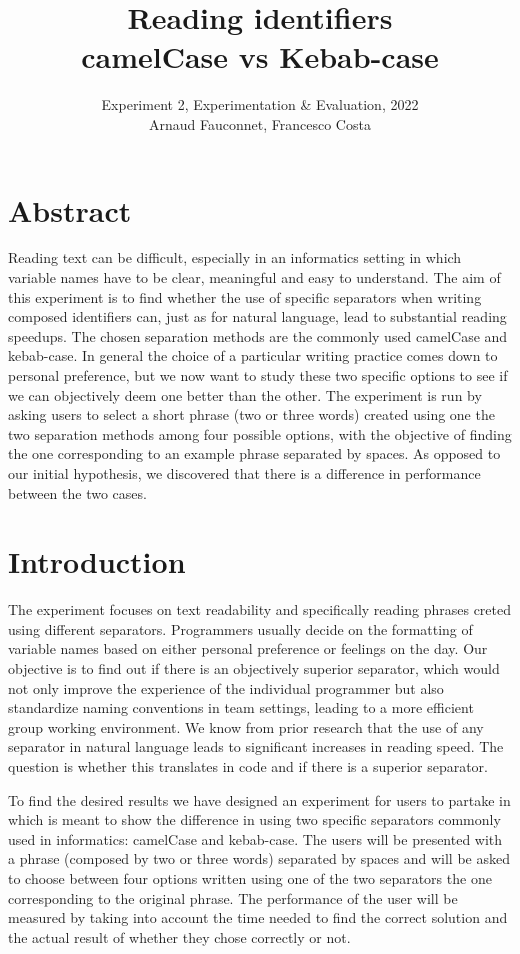 \documentclass{article}
\title{Reading identifiers \\ camelCase vs Kebab-case}
\author{Experiment 2, Experimentation \& Evaluation, 2022\\Arnaud Fauconnet,
	Francesco Costa}
\date{}
\begin{document}
\maketitle
\tableofcontents

\section*{Abstract}
Reading text can be difficult, especially in an informatics setting in which variable names have to be clear, meaningful and 
easy to understand. The aim of this experiment is to find whether the use of specific separators when writing composed identifiers 
can, just as for natural language, lead to substantial reading speedups. The chosen separation methods are the commonly used camelCase and 
kebab-case. In general the choice of a particular writing practice comes down to personal preference, but we now want to study these two 
specific options to see if we can objectively deem one better than the other. The experiment is run by asking users to select a short phrase (two or three words) 
created using one the two separation methods among four possible options, with the objective of finding the one corresponding to an example phrase 
separated by spaces. As opposed to our initial hypothesis, we discovered that there is a difference in performance between the two cases.

\newpage 
\section{Introduction}
The experiment focuses on text readability and specifically reading phrases creted using different separators. Programmers usually decide on the formatting of 
variable names based on either personal preference or feelings on the day. Our objective is to find out if there is an objectively superior separator, which would 
not only improve the experience of the individual programmer but also standardize naming conventions in team settings, leading to a more 
efficient group working environment.
We know from prior research that the use of any separator in natural language leads to significant increases in reading speed. The question is whether this translates in 
code and if there is a superior separator. 

To find the desired results we have designed an experiment for users to partake in which is meant to show the difference in using two specific separators commonly 
used in informatics: camelCase and kebab-case. The users will be presented with a phrase (composed by two or three words) separated by spaces and will be asked to choose between four options 
written using one of the two separators the one corresponding to the original phrase. The performance of the user will be measured by taking into account the time needed to 
find the correct solution and the actual result of whether they chose correctly or not.
\end{document}

